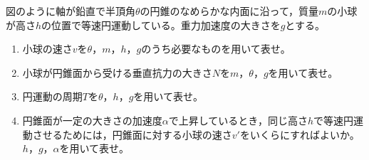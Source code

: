 \hakosyokika
\item
    \begin{mawarikomi}{150pt}{}
        図のように軸が鉛直で半頂角$\theta $の円錐のなめらかな内面に沿って，質量$m$の小球が高さ$h$の位置で等速円運動している。重力加速度の大きさを$g$とする。
        \begin{enumerate}
            \item 小球の速さ$v$を$\theta $，$m$，$h$，$g$のうち必要なものを用いて表せ。
            \item 小球が円錐面から受ける垂直抗力の大きさ$N$を$m$，$\theta $，$g$を用いて表せ。
            \item 円運動の周期$T$を$\theta $，$h$，$g$を用いて表せ。
            \item 円錐面が一定の大きさの加速度$\alpha $で上昇しているとき，同じ高さ$h$で等速円運動させるためには，円錐面に対する小球の速さ$v'$をいくらにすればよいか。$h$，$g$，$\alpha $を用いて表せ。
        \end{enumerate}
    \end{mawarikomi}